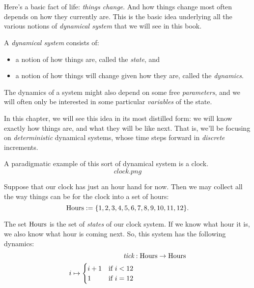 \documentclass[DynamicalBook]{subfiles}
\begin{document}
%


\setcounter{chapter}{0}%


\chapter{}


Here's a basic fact of life: \emph{things change}. And how things change most
often depends on how they currently are. This is the basic idea underlying all the various notions of \emph{dynamical
  system} that we will see in this book.

\begin{defn}
  A \emph{dynamical system} consists of:
  \begin{itemize}
  \item a notion of how things are, called the \emph{state}, and
  \item a notion of how things will change given how they are, called the \emph{dynamics}.
  \end{itemize}
  The dynamics of a system might also depend on some free \emph{parameters}, and
  we will often only be interested in some particular \emph{variables} of the
  state. 
\end{defn}

In this chapter, we will see this idea in its
most distilled form: we will know exactly how things are, and what they will be
like next. That is, we'll be focusing on \emph{deterministic} dynamical systems,
whose time steps forward in \emph{discrete} increments.

A paradigmatic example of this sort of dynamical system is a clock.
\[
clock.png
\]

Suppose that our clock has just an hour hand for now. Then we may collect all
the way things can be for the clock into a set of hours:
$$\mathrm{Hours} := \{1, 2, 3, 4, 5, 6, 7, 8, 9, 10, 11, 12\}.$$

The set $\mathrm{Hours}$ is the set of \emph{states} of our clock system. If we know what hour it is, we also know what hour is coming next. So, this system has the following dynamics:
\begin{align*}
  \textit{tick} &: \mathrm{Hours} \to \mathrm{Hours} \\
                i \mapsto \begin{cases} i + 1 &\mbox{if $i < 12$}\\ 1 &\mbox{if $i = 12$}  \end{cases}
\end{align*}
\end{document}

